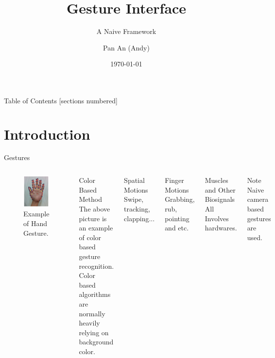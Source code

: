 \documentclass[10pt]{beamer}
\title{Gesture Interface}
\subtitle{A Naive Framework}
\date{\today}
\author{Pan An (Andy)}
\institute{National University of Singapore}
\begin{document}
\maketitle

\begin{frame}{Table of Contents}
  [sections numbered]
  \tableofcontents[hideallsubsections]
\end{frame}

\section{Introduction}


\begin{frame}[fragile]{Gestures}
  \begin{columns}[T,onlytextwidth]
    \begin{figure}[!ht]
      \centering
      \includegraphics[width=3cm]{ges.jpg}
      \caption{\scriptsize{} Example of Hand Gesture.}
      \label{fig:gesture}
    \end{figure}
    \begin{block}{Color Based Method}
      \scriptsize
      The above picture is an example of color based gesture
      recognition. Color based algorithms are normally heavily relying
      on background color. 
    \end{block}

    
    \vspace{8mm}
    \begin{block}{Spatial Motions}
      Swipe, tracking, clapping...
    \end{block}

    \begin{block}{Finger Motions}
      Grabbing, rub, pointing and etc.
    \end{block}

    \begin{block}{Muscles and Other Biosignals}
      All Involves hardwares.
    \end{block}

    \begin{alertblock}{Note}
      Naive camera based gestures are used.  
    \end{alertblock}
  \end{columns}
\end{frame}
\end{document}
